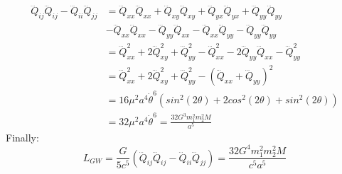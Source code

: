 \begin{align}
    \dddot Q_{ij}\dddot Q_{ij} - \dddot Q_{ii}\dddot Q_{jj}&=\dddot Q_{xx}\dddot Q_{xx}+\dddot Q_{xy}\dddot Q_{xy}+\dddot Q_{yx}\dddot Q_{yx}+\dddot Q_{yy}\dddot Q_{yy}\\
    &-\dddot Q_{xx}\dddot Q_{xx}-\dddot Q_{yy}\dddot Q_{xx}-\dddot Q_{xx}\dddot Q_{yy}-\dddot Q_{yy}\dddot Q_{yy}\\
    &=\dddot Q_{xx}^2+2\dddot Q_{xy}^2+\dddot Q_{yy}^2-\dddot Q_{xx}^2-2\dddot Q_{yy}\dddot Q_{xx}-\dddot Q_{yy}^2\\
    &=\dddot Q_{xx}^2+2\dddot Q_{xy}^2+\dddot Q_{yy}^2-(\dddot Q_{xx}+\dddot Q_{yy})^2\\
    &=16\mu^2 a^4 \dot\theta^6(sin^2(2\theta)+2cos^2(2\theta)+sin^2(2\theta))\\
    &=32\mu^2 a^4 \dot\theta^6=\frac{32G^3m_1^2m_2^2M}{a^5}
\end{align}
Finally:
\begin{equation}
    L_{GW}=\frac{G}{5c^5}(\dddot Q_{ij}\dddot Q_{ij} - \dddot Q_{ii}\dddot Q_{jj})=\frac{32G^4 m_1^2 m_2^2M}{c^5a^5}
\end{equation}
